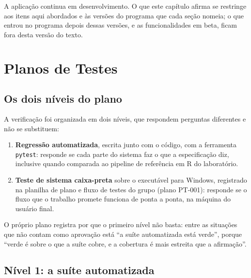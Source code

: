 A aplicação continua em desenvolvimento. O que este capítulo afirma se restringe aos itens aqui abordados e às versões do programa que cada seção nomeia; o que entrou no programa depois dessas versões, e as funcionalidades em beta, ficam fora desta versão do texto.


\section{Planos de Testes}\label{sec:5-1}

\subsection{Os dois níveis do plano}\label{sec:5-1-1}

A verificação foi organizada em dois níveis, que respondem perguntas diferentes e não se substituem:

\begin{enumerate}
\item \textbf{Regressão automatizada}, escrita junto com o código, com a ferramenta \texttt{pytest}: responde se cada parte do sistema faz o que a especificação diz, inclusive quando comparada ao pipeline de referência em R do laboratório.
\item \textbf{Teste de sistema caixa-preta} sobre o executável para Windows, registrado na planilha de plano e fluxo de testes do grupo (plano PT-001): responde se o fluxo que o trabalho promete funciona de ponta a ponta, na máquina do usuário final.
\end{enumerate}

O próprio plano registra por que o primeiro nível não basta: entre as situações que não contam como aprovação está ``a suíte automatizada está verde'', porque ``verde é sobre o que a suíte cobre, e a cobertura é mais estreita que a afirmação''.


\subsection{Nível 1: a suíte automatizada}\label{sec:5-1-2}

